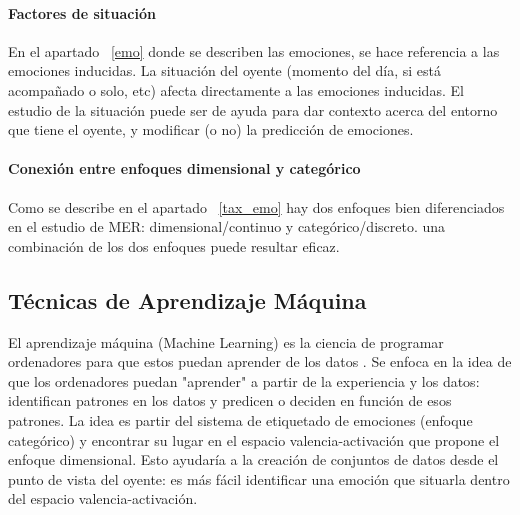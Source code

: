 \documentclass[12pt,a4paper,Spanish]{article}
\begin{document}
\paragraph{Factores de situación}
En el apartado ~\ref{emo} donde se describen las emociones, se hace referencia a las emociones inducidas. La situación del oyente (momento del día, si está acompañado o solo, etc) afecta directamente a las emociones inducidas. El estudio de la situación puede ser de ayuda para dar contexto acerca del entorno que tiene el oyente, y modificar (o no) la predicción de emociones.

\paragraph{Conexión entre enfoques dimensional y categórico}
Como se describe en el apartado ~\ref{tax_emo} hay dos enfoques bien diferenciados en el estudio de MER: dimensional/continuo y categórico/discreto. una combinación de los dos enfoques puede resultar eficaz.

\subsection{Técnicas de Aprendizaje Máquina}

El aprendizaje máquina (Machine Learning) es la ciencia de programar ordenadores para que estos puedan aprender de los datos \cite{geron2022hands}. Se enfoca en la idea de que los ordenadores puedan "aprender" a partir de la experiencia y los datos: identifican patrones en los datos y predicen o deciden en función de esos patrones. La idea es partir del sistema de etiquetado de emociones (enfoque categórico) y encontrar su lugar en el espacio valencia-activación que propone el enfoque dimensional. Esto ayudaría a la creación de conjuntos de datos desde el punto de vista del oyente: es más fácil identificar una emoción que situarla dentro del espacio valencia-activación.
\end{document}
